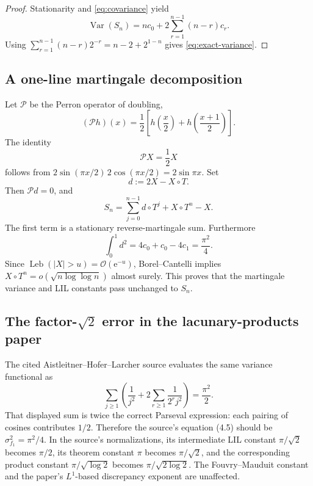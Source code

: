 \documentclass[11pt]{article}
\theoremstyle{definition}
\theoremstyle{remark}
\newcommand{\e}{\mathrm e}
\newcommand{\Var}{\operatorname{Var}}
\newcommand{\Leb}{\operatorname{Leb}}
\newcommand{\bigO}{\mathcal O}
\newcommand{\T}{T}
\begin{document}
\begin{proof}
Stationarity and \eqref{eq:covariance} yield
\[
 \Var(S_n)=nc_0+2\sum_{r=1}^{n-1}(n-r)c_r.
\]
Using \(\sum_{r=1}^{n-1}(n-r)2^{-r}=n-2+2^{1-n}\) gives
\eqref{eq:exact-variance}.
\end{proof}

\subsection{A one-line martingale decomposition}

Let \(\mathcal P\) be the Perron operator of doubling,
\begin{equation}
 (\mathcal Ph)(x)=\frac12\left[h\!\left(\frac x2\right)
 +h\!\left(\frac{x+1}{2}\right)\right].
 \label{eq:Perron-unweighted}
\end{equation}
The identity
\begin{equation}
 \mathcal PX=\frac12X
 \label{eq:PX}
\end{equation}
follows from \(2\sin(\pi x/2)\,2\cos(\pi x/2)=2\sin\pi x\).
Set
\begin{equation}
 d:=2X-X\circ\T.
 \label{eq:d}
\end{equation}
Then \(\mathcal Pd=0\), and
\begin{equation}
 S_n=\sum_{j=0}^{n-1}d\circ\T^j+X\circ\T^n-X.
 \label{eq:martingale-decomp}
\end{equation}
The first term is a stationary reverse-martingale sum.  Furthermore
\begin{equation}
 \int_0^1d^2
 =4c_0+c_0-4c_1=\frac{\pi^2}{4}.
 \label{eq:d-variance}
\end{equation}
Since \(\Leb(|X|>u)=\bigO(\e^{-u})\), Borel--Cantelli implies
\(X\circ\T^n=o(\sqrt{n\log\log n})\) almost surely.  This proves that the
martingale variance and LIL constants pass unchanged to \(S_n\).

\subsection{The factor-\texorpdfstring{\(\sqrt2\)}{sqrt(2)} error in the lacunary-products paper}

The cited Aistleitner--Hofer--Larcher source\cite{ahl2017,ahl-source} evaluates the same variance
functional as
\[
 \sum_{j\ge1}\left(\frac1{j^2}
 +2\sum_{r\ge1}\frac1{2^rj^2}\right)=\frac{\pi^2}{2}.
\]
That displayed sum is twice the correct Parseval expression: each pairing of
cosines contributes \(1/2\).  Therefore the source's equation (4.5) should be
\(\sigma_{f_1}^2=\pi^2/4\).  In the source's normalizations, its intermediate
LIL constant \(\pi/\sqrt2\) becomes \(\pi/2\), its theorem constant \(\pi\)
becomes \(\pi/\sqrt2\), and the corresponding product constant
\(\pi/\sqrt{\log2}\) becomes
\(\pi/\sqrt{2\log2}\).  The Fouvry--Mauduit constant and the paper's
\(L^1\)-based discrepancy exponent are unaffected.
\end{document}
